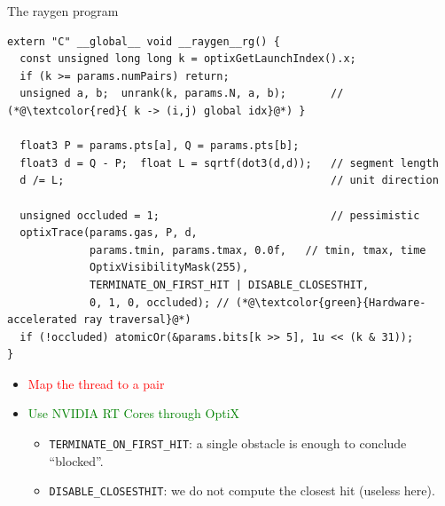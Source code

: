 \documentclass[8pt, xcolor=table,aspectratio=169]{beamer}
\begin{document}
\begin{frame}[fragile]{\textcolor{activecolor}{The raygen program}}
\begin{center}
  
  \begin{lstlisting}[basicstyle=\fontsize{8}{9}\selectfont\ttfamily]
extern "C" __global__ void __raygen__rg() {
  const unsigned long long k = optixGetLaunchIndex().x;
  if (k >= params.numPairs) return;
  unsigned a, b;  unrank(k, params.N, a, b);       // (*@\textcolor{red}{ k -> (i,j) global idx}@*) }

  float3 P = params.pts[a], Q = params.pts[b];
  float3 d = Q - P;  float L = sqrtf(dot3(d,d));   // segment length
  d /= L;                                          // unit direction

  unsigned occluded = 1;                           // pessimistic
  optixTrace(params.gas, P, d,
             params.tmin, params.tmax, 0.0f,   // tmin, tmax, time
             OptixVisibilityMask(255),
             TERMINATE_ON_FIRST_HIT | DISABLE_CLOSESTHIT,
             0, 1, 0, occluded); // (*@\textcolor{green}{Hardware-accelerated ray traversal}@*)
  if (!occluded) atomicOr(&params.bits[k >> 5], 1u << (k & 31));
}
\end{lstlisting}
\end{center}
 \begin{itemize}
        \item \textcolor{red}{Map the thread to a pair} 
        \item  \textcolor{green}{Use NVIDIA RT Cores through OptiX}
        \begin{itemize}
        \item \texttt{TERMINATE\_ON\_FIRST\_HIT}: a single obstacle is enough to conclude ``blocked''.
        \item \texttt{DISABLE\_CLOSESTHIT}: we do not compute the closest hit (useless here).
        \end{itemize}
  \end{itemize}
\end{frame}
\end{document}
